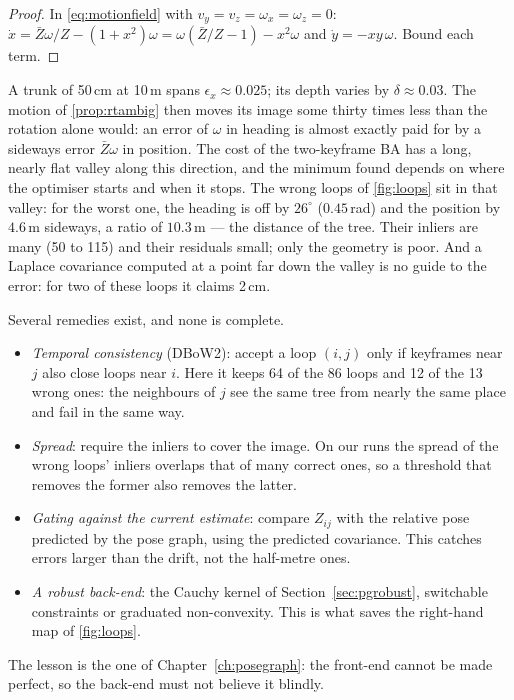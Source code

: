 \begin{proof}
In \eqref{eq:motionfield} with $v_y=v_z=\omega_x=\omega_z=0$:
$\dot x=\bar Z\omega/Z-(1+x^2)\omega=\omega(\bar Z/Z-1)-x^2\omega$ and
$\dot y=-xy\,\omega$. Bound each term.
\end{proof}

A trunk of 50\,cm at 10\,m spans $\epsilon_x\approx0.025$; its depth
varies by $\delta\approx0.03$. The motion of
\cref{prop:rtambig} then moves its image some thirty times less than
the rotation alone would: an error of $\omega$ in heading is
almost exactly paid for by a sideways error $\bar Z\omega$ in position.
The cost of the two-keyframe BA has a long, nearly flat valley along
this direction, and the minimum found depends on where the optimiser
starts and when it stops. The wrong loops of \cref{fig:loops} sit in
that valley: for the worst one, the heading is off by $26^\circ$
($0.45$\,rad) and the position by $4.6$\,m sideways, a ratio of
$10.3$\,m --- the distance of the tree. Their inliers are many (50 to
115) and their residuals small; only the geometry is poor. And a
Laplace covariance computed at a point far down the valley is no
guide to the error: for two of these loops it claims 2\,cm.

Several remedies exist, and none is complete.
\begin{itemize}[nosep]
\item \emph{Temporal consistency} (DBoW2): accept a loop $(i,j)$ only
  if keyframes near $j$ also close loops near $i$. Here it keeps 64 of
  the 86 loops and 12 of the 13 wrong ones: the neighbours of $j$ see
  the same tree from nearly the same place and fail in the same way.
\item \emph{Spread}: require the inliers to cover the image. On our
  runs the spread of the wrong loops' inliers overlaps that of many
  correct ones, so a threshold that removes the former also removes
  the latter.
\item \emph{Gating against the current estimate}: compare $Z_{ij}$ with
  the relative pose predicted by the pose graph, using the predicted
  covariance. This catches errors larger than the drift, not the
  half-metre ones.
\item \emph{A robust back-end}: the Cauchy kernel of
  Section~\ref{sec:pgrobust}, switchable constraints or graduated
  non-convexity. This is what saves the right-hand map of
  \cref{fig:loops}.
\end{itemize}
The lesson is the one of Chapter~\ref{ch:posegraph}: the front-end
cannot be made perfect, so the back-end must not believe it blindly.

